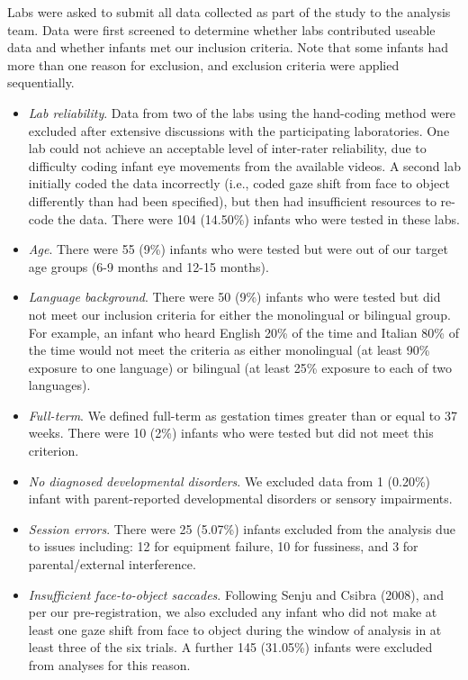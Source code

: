 \documentclass[,man,floatsintext]{apa6}
\begin{document}
Labs were asked to submit all data collected as part of the study to the analysis team. Data were first screened to determine whether labs contributed useable data and whether infants met our inclusion criteria. Note that some infants had more than one reason for exclusion, and exclusion criteria were applied sequentially.

\begin{itemize}
\item
  \emph{Lab reliability}. Data from two of the labs using the hand-coding method were excluded after extensive discussions with the participating laboratories. One lab could not achieve an acceptable level of inter-rater reliability, due to difficulty coding infant eye movements from the available videos. A second lab initially coded the data incorrectly (i.e., coded gaze shift from face to object differently than had been specified), but then had insufficient resources to re-code the data. There were 104 (14.50\%) infants who were tested in these labs.
\item
  \emph{Age}. There were 55 (9\%) infants who were tested but were out of our target age groups (6-9 months and 12-15 months).
\item
  \emph{Language background}. There were 50 (9\%) infants who were tested but did not meet our inclusion criteria for either the monolingual or bilingual group. For example, an infant who heard English 20\% of the time and Italian 80\% of the time would not meet the criteria as either monolingual (at least 90\% exposure to one language) or bilingual (at least 25\% exposure to each of two languages).
\item
  \emph{Full-term}. We defined full-term as gestation times greater than or equal to 37 weeks. There were 10 (2\%) infants who were tested but did not meet this criterion.
\item
  \emph{No diagnosed developmental disorders}. We excluded data from 1 (0.20\%) infant with parent-reported developmental disorders or sensory impairments.
\item
  \emph{Session errors}. There were 25 (5.07\%) infants excluded from the analysis due to issues including: 12 for equipment failure, 10 for fussiness, and 3 for parental/external interference.
\item
  \emph{Insufficient face-to-object saccades}. Following Senju and Csibra (2008), and per our pre-registration, we also excluded any infant who did not make at least one gaze shift from face to object during the window of analysis in at least three of the six trials. A further 145 (31.05\%) infants were excluded from analyses for this reason.

\end{itemize}
\end{document}
